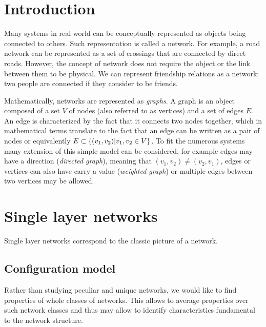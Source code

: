 \documentclass[
11pt, %
english, %
singlespacing, %
liststotoc, %
headsepline, %
]{MastersDoctoralThesis} %
\begin{document}
\pagestyle{thesis} %

\listoftodos

\chapter{Introduction}

Many systems in real world can be conceptually represented as objects being connected to others. Such representation is called a network. For example, a road network can be represented as a set of crossings that are connected by direct roads. However, the concept of network does not require the object or the link between them to be physical. We can represent friendship relations as a network: two people are connected if they consider to be friends.

Mathematically, networks are represented as \emph{graphs}. A graph is an object composed of a set $V$ of nodes (also referred to as vertices) and a set of edges $E$. An edge is characterized by the fact that it connects two nodes together, which in mathematical terms translate to the fact that an edge can be written as a pair of nodes or equivalently $E \subset \{(v_1, v_2) | v_1, v_2 \in V \}$. To fit the numerous systems many extension of this simple model can be considered, for example edges may have a direction (\emph{directed graph}), meaning that $(v_1, v_2) \neq (v_2, v_1)$, edges or vertices can also have carry a value (\emph{weighted graph}) or multiple edges between two vertices may be allowed.



\chapter{Single layer networks}

Single layer networks correspond to the classic picture of a network.

\section{Configuration model}

Rather than studying peculiar and unique networks, we would like to  find properties of whole classes of networks. This allows to average properties over such network classes and thus may allow to identify characteristics fundamental to the network structure.
\end{document}
